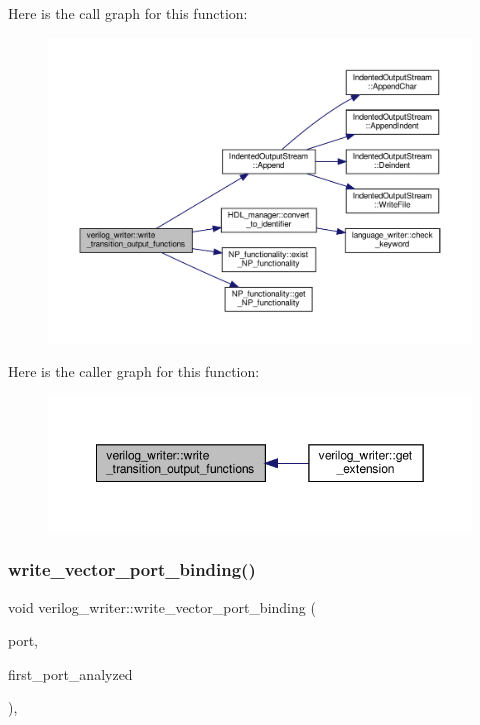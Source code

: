 Here is the call graph for this function\+:
\nopagebreak
\begin{figure}[H]
\begin{center}
\leavevmode
\includegraphics[width=350pt]{d8/dba/classverilog__writer_a2c853b73efc5ca8215061d1055168718_cgraph}
\end{center}
\end{figure}
Here is the caller graph for this function\+:
\nopagebreak
\begin{figure}[H]
\begin{center}
\leavevmode
\includegraphics[width=349pt]{d8/dba/classverilog__writer_a2c853b73efc5ca8215061d1055168718_icgraph}
\end{center}
\end{figure}
\mbox{\label{classverilog__writer_ab9c4a8bd3452e3bb5d3efd13638b48c3}} 
\subsubsection{\texorpdfstring{write\+\_\+vector\+\_\+port\+\_\+binding()}{write\_vector\_port\_binding()}}
{\footnotesize\ttfamily void verilog\+\_\+writer\+::write\+\_\+vector\+\_\+port\+\_\+binding (\begin{DoxyParamCaption}\item[{const \hyperlink{structural__objects_8hpp_a8ea5f8cc50ab8f4c31e2751074ff60b2}{structural\+\_\+object\+Ref} \&}]{port,  }\item[{bool \&}]{first\+\_\+port\+\_\+analyzed }\end{DoxyParamCaption})\hspace{0.3cm}{\ttfamily [override]}, {\ttfamily [virtual]}}



